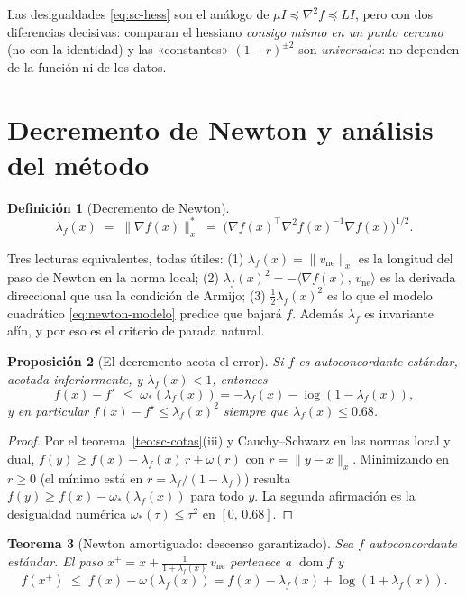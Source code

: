 \documentclass[11pt,a4paper,oneside]{book}
\newtheorem{teorema}{Teorema}[chapter]
\newtheorem{proposicion}[teorema]{Proposición}
\theoremstyle{definition}
\newtheorem{definicion}[teorema]{Definición}
\theoremstyle{remark}
\newcommand{\T}{^{\top}}
\newcommand{\nrm}[1]{\lVert #1\rVert}
\newcommand{\ip}[2]{\langle #1,\, #2\rangle}
\DeclareMathOperator{\dom}{dom}
\newcommand{\lamf}{\lambda_f}
\newcommand{\vne}{v_{\mathrm{ne}}}
\begin{document}
\begin{ideaclave}
Las desigualdades \eqref{eq:sc-hess} son el análogo de $\mu I\preceq\nabla^2 f\preceq LI$, pero con dos
diferencias decisivas: comparan el hessiano \emph{consigo mismo en un punto cercano} (no con la identidad) y
las «constantes» $(1-r)^{\pm2}$ son \emph{universales}: no dependen de la función ni de los datos.
\end{ideaclave}

\section{Decremento de Newton y análisis del método}

\begin{definicion}[Decremento de Newton]\label{def:decremento}
\[ \lamf(x)\;=\;\nrm{\nabla f(x)}_x^{*}\;=\;\bigl(\nabla f(x)\T\nabla^2 f(x)^{-1}\nabla f(x)\bigr)^{1/2}. \]
\end{definicion}

Tres lecturas equivalentes, todas útiles: (1) $\lamf(x)=\nrm{\vne}_x$ es la longitud del paso de Newton en la
norma local; (2) $\lamf(x)^2=-\ip{\nabla f(x)}{\vne}$ es la derivada direccional que usa la condición de Armijo;
(3) $\tfrac12\lamf(x)^2$ es lo que el modelo cuadrático \eqref{eq:newton-modelo} predice que bajará $f$.
Además $\lamf$ es invariante afín, y por eso es el criterio de parada natural.

\begin{proposicion}[El decremento acota el error]\label{prop:gap-lambda}
Si $f$ es autoconcordante estándar, acotada inferiormente, y $\lamf(x)<1$, entonces
\[ f(x)-f^\star\;\le\;\omega_*(\lamf(x))=-\lamf(x)-\log(1-\lamf(x)), \]
y en particular $f(x)-f^\star\le\lamf(x)^2$ siempre que $\lamf(x)\le 0.68$.
\end{proposicion}

\begin{proof}
Por el teorema~\ref{teo:sc-cotas}(iii) y Cauchy--Schwarz en las normas local y dual,
$f(y)\ge f(x)-\lamf(x)\,r+\omega(r)$ con $r=\nrm{y-x}_x$. Minimizando en $r\ge0$ (el mínimo está en
$r=\lamf/(1-\lamf)$) resulta $f(y)\ge f(x)-\omega_*(\lamf(x))$ para todo $y$. La segunda afirmación es la
desigualdad numérica $\omega_*(\tau)\le\tau^2$ en $[0,\,0.68]$.
\end{proof}

\begin{teorema}[Newton amortiguado: descenso garantizado]\label{teo:sc-damped}
Sea $f$ autoconcordante estándar. El paso $x^+=x+\frac{1}{1+\lamf(x)}\,\vne$ pertenece a $\dom f$ y
\[ f(x^+)\;\le\;f(x)-\omega(\lamf(x))=f(x)-\lamf(x)+\log(1+\lamf(x)). \]
\end{teorema}
\end{document}
